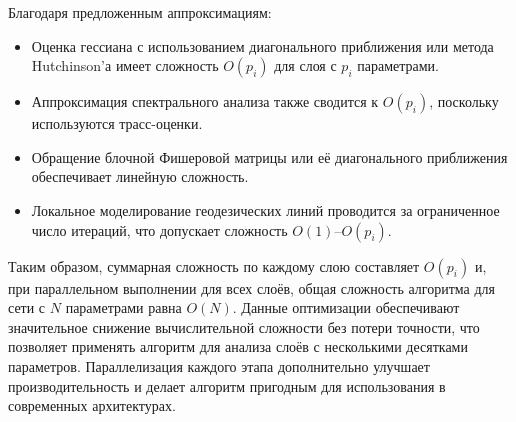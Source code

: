 \documentclass[a4paper,12pt]{article}
\begin{document}
Благодаря предложенным аппроксимациям:
\begin{itemize}
\item Оценка гессиана с использованием диагонального приближения или метода Hutchinson'а имеет сложность \( O(p_i) \) для слоя с \( p_i \) параметрами.
\item Аппроксимация спектрального анализа также сводится к \( O(p_i) \), поскольку используются трасс-оценки.
\item Обращение блочной Фишеровой матрицы или её диагонального приближения обеспечивает линейную сложность.
\item Локальное моделирование геодезических линий проводится за ограниченное число итераций, что допускает сложность \( O(1) \)–\( O(p_i) \).
\end{itemize}
Таким образом, суммарная сложность по каждому слою составляет \( O(p_i) \) и, при параллельном выполнении для всех слоёв, общая сложность алгоритма для сети с \( N \) параметрами равна \( O(N) \). Данные оптимизации обеспечивают значительное снижение вычислительной сложности без потери точности, что позволяет применять алгоритм для анализа слоёв с несколькими десятками параметров. Параллелизация каждого этапа дополнительно улучшает производительность и делает алгоритм пригодным для использования в современных архитектурах.
\end{document}
